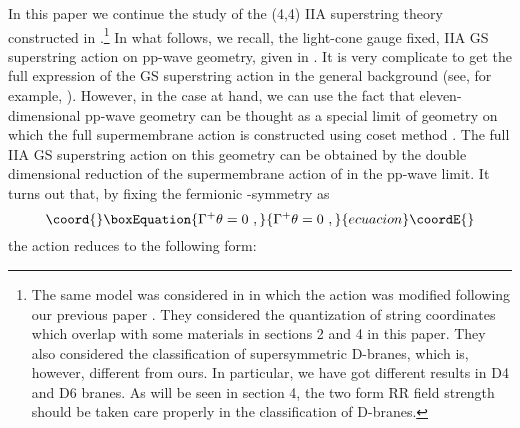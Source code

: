 \documentclass[a4paper,12pt]{article}
\begin{document}
In this paper we continue the study of the (4,4) IIA superstring
theory constructed in \cite{hyu074}.\footnote{The same model was
considered in \cite{sug029} in which the action was modified following
our previous paper \cite{hyu074}. They considered the quantization of
string coordinates which overlap with some materials in sections 2 and
4 in this paper. They also considered the classification of
supersymmetric D-branes, which is, however, different from ours.  In
particular, we have got different results in D4 and D6 branes. As will
be seen in section 4, the two form RR field strength should be taken
care properly in the classification of D-branes.}  In what follows, we
recall, the light-cone gauge fixed, IIA GS superstring action on
pp-wave geometry, given in \cite{hyu074}.  It is very complicate to
get the full expression of the GS superstring action in the general
background (see, for example, \cite{cve202,hyu247}).  However, in the
case at hand, we can use the fact that eleven-dimensional pp-wave
geometry can be thought as a special limit of \coordHE{}
geometry on which the full supermembrane action is constructed using
coset method \cite{dew209}.  The full IIA GS superstring action on
this geometry can be obtained by the double dimensional reduction
\cite{duf70} of the supermembrane action of \cite{dew209} in the
pp-wave limit.  It turns out that, by fixing the fermionic
\myHighlight{$\kappa$}\coordHE{}-symmetry as
\begin{equation}\coord{}\boxEquation{
\Gamma^+ \theta = 0~,
\label{kfix}
}{
\Gamma^+ \theta = 0~,
}{ecuacion}\coordE{}\end{equation}
the action reduces to the following form:
\end{document}
